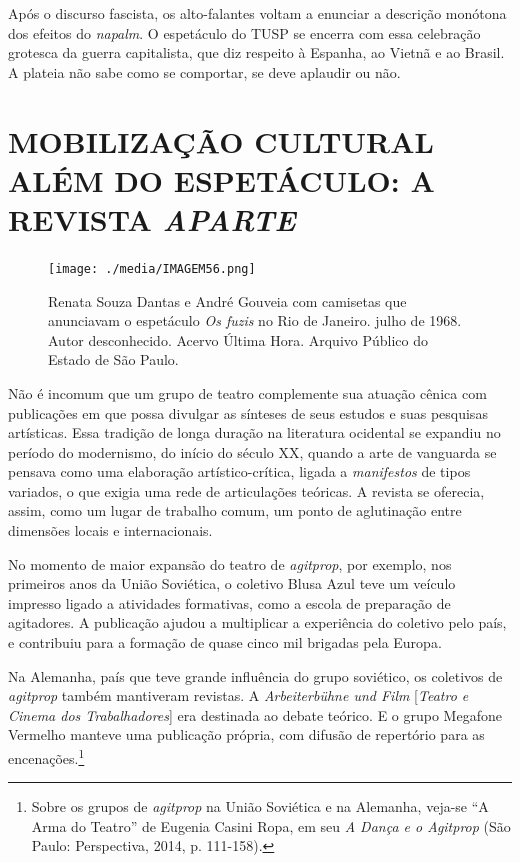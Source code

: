 Após o discurso fascista, os alto-falantes voltam a enunciar a descrição
monótona dos efeitos do \textit{napalm}. O espetáculo do TUSP se encerra
com essa celebração grotesca da guerra capitalista, que diz respeito à
Espanha, ao Vietnã e ao Brasil. A plateia não sabe como se comportar, se
deve aplaudir ou não.

\chapter{MOBILIZAÇÃO CULTURAL ALÉM DO ESPETÁCULO: A REVISTA \textit{APARTE}}

\begin{figure}
\texttt{[image: ./media/IMAGEM56.png]}
\caption{Renata Souza Dantas e André Gouveia com camisetas que anunciavam o
espetáculo \textit{Os fuzis} no Rio de Janeiro. julho de 1968. Autor
desconhecido. Acervo Última Hora. Arquivo Público do Estado de São
Paulo.}
\end{figure}

Não é incomum que um grupo de teatro complemente sua atuação cênica com
publicações em que possa divulgar as sínteses de seus estudos e suas
pesquisas artísticas. Essa tradição de longa duração na literatura
ocidental se expandiu no período do modernismo, do início do século XX,
quando a arte de vanguarda se pensava como uma elaboração
artístico-crítica, ligada a \textit{manifestos} de tipos variados, o que
exigia uma rede de articulações teóricas. A revista se oferecia, assim,
como um lugar de trabalho comum, um ponto de aglutinação entre dimensões
locais e internacionais.

No momento de maior expansão do teatro de \textit{agitprop}, por exemplo,
nos primeiros anos da União Soviética, o coletivo Blusa Azul teve um
veículo impresso ligado a atividades formativas, como a escola de
preparação de agitadores. A publicação ajudou a multiplicar a
experiência do coletivo pelo país, e contribuiu para a formação de quase
cinco mil brigadas pela Europa.

Na Alemanha, país que teve grande influência do grupo soviético, os
coletivos de \textit{agitprop} também mantiveram revistas. A
\textit{Arbeiterbühne und Film} {[}\textit{Teatro e Cinema dos
Trabalhadores}{]} era destinada ao debate teórico. E o grupo Megafone
Vermelho manteve uma publicação própria, com difusão de repertório para
as encenações.\footnote{Sobre os grupos de \textit{agitprop} na União
  Soviética e na Alemanha, veja-se “A Arma do Teatro” de Eugenia Casini
  Ropa, em seu \textit{A Dança e o Agitprop} (São Paulo: Perspectiva, 2014,
  p. 111-158).}

